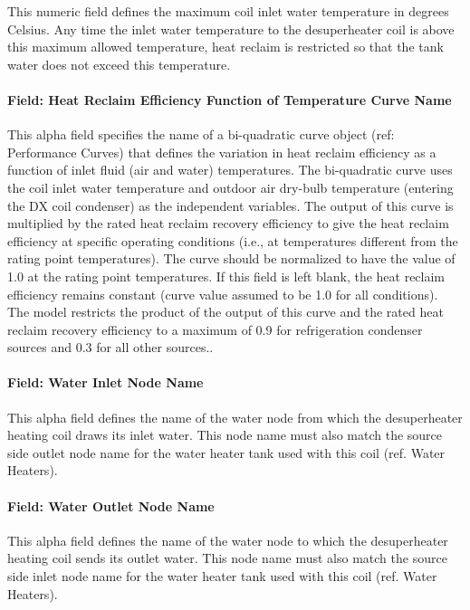 This numeric field defines the maximum coil inlet water temperature in degrees Celsius. Any time the inlet water temperature to the desuperheater coil is above this maximum allowed temperature, heat reclaim is restricted so that the tank water does not exceed this temperature.

\paragraph{Field: Heat Reclaim Efficiency Function of Temperature Curve Name}\label{field-heat-reclaim-efficiency-function-of-temperature-curve-name}

This alpha field specifies the name of a bi-quadratic curve object (ref: Performance Curves) that defines the variation in heat reclaim efficiency as a function of inlet fluid (air and water) temperatures. The bi-quadratic curve uses the coil inlet water temperature and outdoor air dry-bulb temperature (entering the DX coil condenser) as the independent variables. The output of this curve is multiplied by the rated heat reclaim recovery efficiency to give the heat reclaim efficiency at specific operating conditions (i.e., at temperatures different from the rating point temperatures). The curve should be normalized to have the value of 1.0 at the rating point temperatures. If this field is left blank, the heat reclaim efficiency remains constant (curve value assumed to be 1.0 for all conditions). The model restricts the product of the output of this curve and the rated heat reclaim recovery efficiency to a maximum of 0.9 for refrigeration condenser sources and 0.3 for all other sources..

\paragraph{Field: Water Inlet Node Name}\label{field-water-inlet-node-name-4-000}

This alpha field defines the name of the water node from which the desuperheater heating coil draws its inlet water. This node name must also match the source side outlet node name for the water heater tank used with this coil (ref. Water Heaters).

\paragraph{Field: Water Outlet Node Name}\label{field-water-outlet-node-name-4-000}

This alpha field defines the name of the water node to which the desuperheater heating coil sends its outlet water. This node name must also match the source side inlet node name for the water heater tank used with this coil (ref. Water Heaters).

